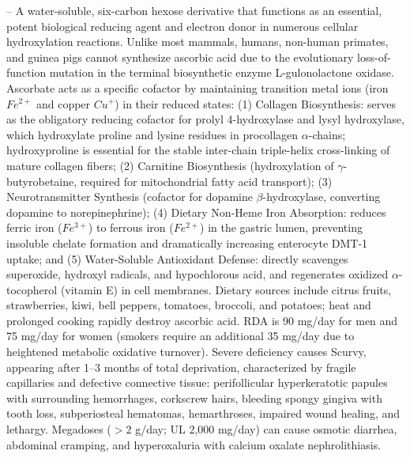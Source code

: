 -- A water-soluble, six-carbon hexose derivative that functions as an essential, potent biological reducing agent and electron donor in numerous cellular hydroxylation reactions. Unlike most mammals, humans, non-human primates, and guinea pigs cannot synthesize ascorbic acid due to the evolutionary loss-of-function mutation in the terminal biosynthetic enzyme L-gulonolactone oxidase. Ascorbate acts as a specific cofactor by maintaining transition metal ions (iron $Fe^{2+}$ and copper $Cu^+$) in their reduced states: (1) Collagen Biosynthesis: serves as the obligatory reducing cofactor for prolyl 4-hydroxylase and lysyl hydroxylase, which hydroxylate proline and lysine residues in procollagen $\alpha$-chains; hydroxyproline is essential for the stable inter-chain triple-helix cross-linking of mature collagen fibers; (2) Carnitine Biosynthesis (hydroxylation of $\gamma$-butyrobetaine, required for mitochondrial fatty acid transport); (3) Neurotransmitter Synthesis (cofactor for dopamine $\beta$-hydroxylase, converting dopamine to norepinephrine); (4) Dietary Non-Heme Iron Absorption: reduces ferric iron ($Fe^{3+}$) to ferrous iron ($Fe^{2+}$) in the gastric lumen, preventing insoluble chelate formation and dramatically increasing enterocyte DMT-1 uptake; and (5) Water-Soluble Antioxidant Defense: directly scavenges superoxide, hydroxyl radicals, and hypochlorous acid, and regenerates oxidized $\alpha$-tocopherol (vitamin E) in cell membranes. Dietary sources include citrus fruits, strawberries, kiwi, bell peppers, tomatoes, broccoli, and potatoes; heat and prolonged cooking rapidly destroy ascorbic acid. RDA is 90 mg/day for men and 75 mg/day for women (smokers require an additional 35 mg/day due to heightened metabolic oxidative turnover). Severe deficiency causes Scurvy, appearing after 1--3 months of total deprivation, characterized by fragile capillaries and defective connective tissue: perifollicular hyperkeratotic papules with surrounding hemorrhages, corkscrew hairs, bleeding spongy gingiva with tooth loss, subperiosteal hematomas, hemarthroses, impaired wound healing, and lethargy. Megadoses ($>2$ g/day; UL 2,000 mg/day) can cause osmotic diarrhea, abdominal cramping, and hyperoxaluria with calcium oxalate nephrolithiasis.

